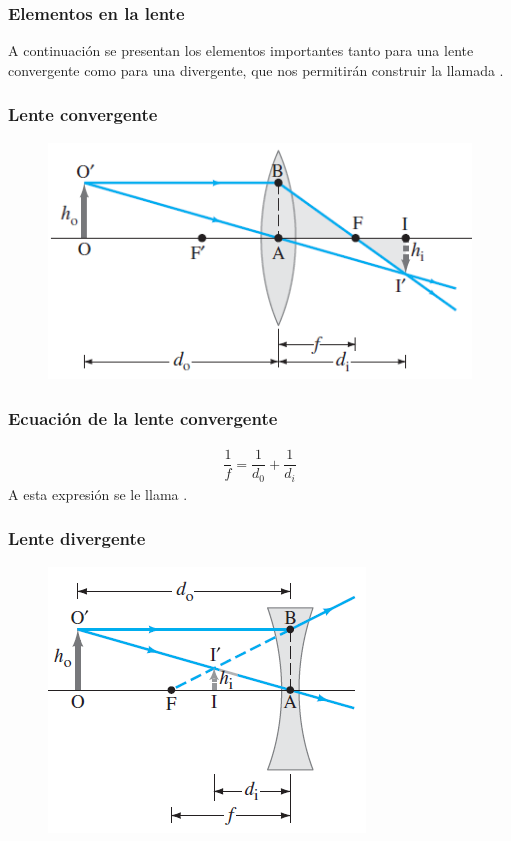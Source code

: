 \documentclass[14pt]{beamer}
\begin{document}
\begin{frame}
\frametitle{Elementos en la lente}
A continuación se presentan los elementos importantes tanto para una lente convergente como para una divergente, \pause que nos permitirán construir la llamada .
\end{frame}
\begin{frame}
\frametitle{Lente convergente}
\begin{figure}
    \centering
    \includegraphics[scale=0.8]{Imagenes/Formacion_Imagen_05.png}
\end{figure}
\end{frame}
\begin{frame}
\frametitle{Ecuación de la lente convergente}
\begin{align*}
\dfrac{1}{f} = \dfrac{1}{d_{0}} + \dfrac{1}{d_{i}}
\end{align*}
A esta expresión se le llama .
\end{frame}
\begin{frame}
\frametitle{Lente divergente}
\begin{figure}
    \centering
    \includegraphics[scale=0.8]{Imagenes/Formacion_Imagen_06.png}
\end{figure}
\end{frame}
\end{document}
